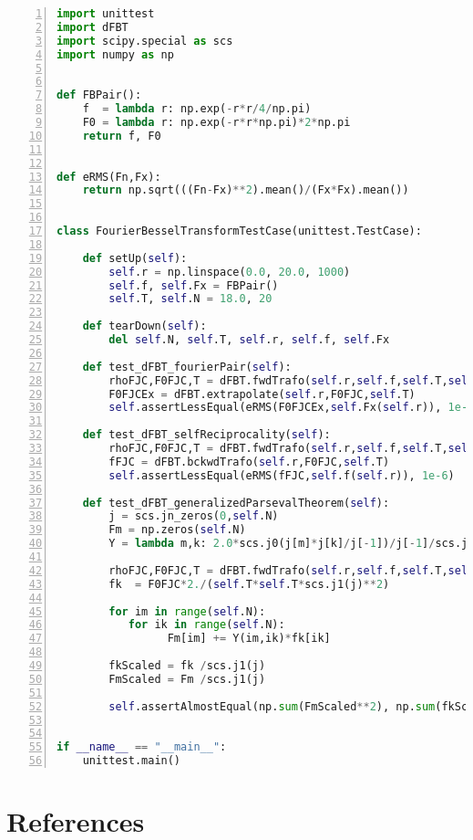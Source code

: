 \documentclass[12pt]{iopart}
\begin{document}
\begin{lstlisting}[float, floatplacement=H, numbers=left, captionpos=b,keywordstyle=\bf, frame=lines, language=Python,basicstyle=\ttfamily\scriptsize, caption={Collection of testcases contained in {\tt{python}} script file {\tt{test\_dFBT.py}}. These test are intended to assess and verify a correct function of the procedures implementing the discrete fourier bessel transform in module file {\tt{dFBT.py}}.}, label=code:unittest]
import unittest
import dFBT
import scipy.special as scs
import numpy as np


def FBPair():
    f  = lambda r: np.exp(-r*r/4/np.pi) 
    F0 = lambda r: np.exp(-r*r*np.pi)*2*np.pi     
    return f, F0


def eRMS(Fn,Fx):
    return np.sqrt(((Fn-Fx)**2).mean()/(Fx*Fx).mean())


class FourierBesselTransformTestCase(unittest.TestCase):

    def setUp(self):
        self.r = np.linspace(0.0, 20.0, 1000)
        self.f, self.Fx = FBPair()
        self.T, self.N = 18.0, 20

    def tearDown(self):
        del self.N, self.T, self.r, self.f, self.Fx

    def test_dFBT_fourierPair(self):
        rhoFJC,F0FJC,T = dFBT.fwdTrafo(self.r,self.f,self.T,self.N)
        F0FJCEx = dFBT.extrapolate(self.r,F0FJC,self.T)
        self.assertLessEqual(eRMS(F0FJCEx,self.Fx(self.r)), 1e-6)

    def test_dFBT_selfReciprocality(self): 
        rhoFJC,F0FJC,T = dFBT.fwdTrafo(self.r,self.f,self.T,self.N)
        fFJC = dFBT.bckwdTrafo(self.r,F0FJC,self.T)
        self.assertLessEqual(eRMS(fFJC,self.f(self.r)), 1e-6)

    def test_dFBT_generalizedParsevalTheorem(self):
        j = scs.jn_zeros(0,self.N)
        Fm = np.zeros(self.N)
        Y = lambda m,k: 2.0*scs.j0(j[m]*j[k]/j[-1])/j[-1]/scs.j1(j[k])**2

        rhoFJC,F0FJC,T = dFBT.fwdTrafo(self.r,self.f,self.T,self.N)
        fk  = F0FJC*2./(self.T*self.T*scs.j1(j)**2)

        for im in range(self.N):
           for ik in range(self.N):
                 Fm[im] += Y(im,ik)*fk[ik]

        fkScaled = fk /scs.j1(j)
        FmScaled = Fm /scs.j1(j)

        self.assertAlmostEqual(np.sum(FmScaled**2), np.sum(fkScaled**2), 6)
            

if __name__ == "__main__":
    unittest.main()
\end{lstlisting}


\clearpage
\section*{References}

\end{document}
